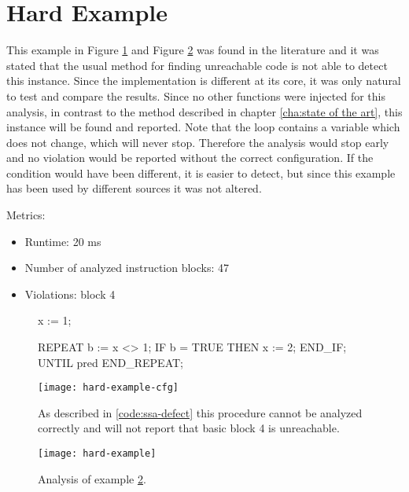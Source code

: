 \section{Hard Example}
This example in Figure \ref{code:hard example 1} and Figure \ref{code:hard example 1 cfg} was found in the literature \cite{Click_1995} and it was stated that the usual method for finding unreachable code is not able to detect this instance. 
Since the implementation is different at its core, it was only natural to test and compare the results.
Since no other functions were injected for this analysis, in contrast to the method described in chapter \ref{cha:state of the art}, this instance will be found and reported.
Note that the loop contains a variable which does not change, which will never stop. Therefore the analysis would stop early and no violation would be reported without the correct configuration. 
If the condition would have been different, it is easier to detect, but since this example has been used by different sources it was not altered.


Metrics:
\begin{itemize}
	\item Runtime: 20 ms
	\item Number of analyzed instruction blocks: 47
	\item Violations: block 4
\end{itemize}

\begin{figure}
	\begin{GenericCode}
x := 1;
	
REPEAT
	b := x <> 1;
	IF b = TRUE THEN
		x := 2;
	END_IF;    
UNTIL pred
END_REPEAT;	\end{GenericCode}
	\centering
	\texttt{[image: hard-example-cfg]}
	\caption{As described in \ref{code:ssa-defect} this procedure cannot be analyzed correctly and will not report that basic block 4 is unreachable. }
	\label{code:hard example 1}
\end{figure}
\begin{figure}
	\centering
	\texttt{[image: hard-example]}
	\caption{Analysis of example \ref{code:hard example 1 cfg}.}
	\label{code:hard example 1 cfg}
\end{figure}



